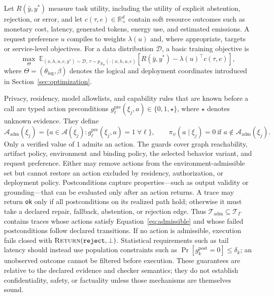 Let $R(\bar y,y^*)$ measure task utility, including the utility of explicit
abstention, rejection, or error, and let
$c(\tau,e)\in\mathbb{R}_{+}^{d}$ contain soft resource outcomes such as monetary
cost, latency, generated tokens, energy use, and estimated emissions. A
request preference $u$ compiles to weights $\lambda(u)$ and, where appropriate,
targets or service-level objectives.  For a data distribution $\mathcal{D}$, a
basic training objective is
\begin{equation}
 \max_{\Theta}
 \;\mathbb{E}_{(x,h,u,e,y^*)\sim\mathcal{D},\,
 \tau\sim p_{\mathcal{R}_{\Theta}}(\cdot\mid x,h,u,e)}
 \left[R(\bar y,y^*)-\lambda(u)^{\top}c(\tau,e)\right],
 \label{eq:soft-objective}
\end{equation}
where $\Theta=(\theta_{\mathrm{log}},\beta)$ denotes the logical and deployment
coordinates introduced in Section~\ref{sec:optimization}.

Privacy, residency, model allowlists, and capability rules that are known
before a call are typed action preconditions
$g_\ell^{\mathrm{pre}}(\xi_j,a)\in\{0,1,\star\}$, where $\star$ denotes
unknown evidence. They define
\begin{equation}
 \mathcal{A}_{\mathrm{adm}}(\xi_j)
 =\{a\in\mathcal{A}(\xi_j):
 g_\ell^{\mathrm{pre}}(\xi_j,a)=1\;\forall \ell\},
 \qquad
 \pi_\psi(a\mid\xi_j)=0\ \text{if }a\notin\mathcal{A}_{\mathrm{adm}}(\xi_j).
 \label{eq:admissible}
\end{equation}
Only a verified value of $1$ admits an action. The guards cover graph
reachability, artifact policy, environment and binding policy, the selected
behavior variant, and request preference. Either may remove actions from the
environment-admissible set but cannot restore an action excluded by residency,
authorization, or deployment policy.
Postconditions capture properties---such as output validity or grounding---that
can be evaluated only after an action returns. A trace may return \texttt{ok}
only if all postconditions on its realized path hold; otherwise it must take a
declared repair, fallback, abstention, or rejection edge. Thus
$\mathcal{T}_{\mathrm{adm}}\subseteq\mathcal{T}_{\Gamma}$ contains traces whose
actions satisfy Equation~\ref{eq:admissible} and whose failed postconditions
follow declared transitions. If no action is admissible, execution fails closed
with $\textsc{Return}(\texttt{reject},\bot)$. Statistical requirements such as
tail latency should instead use population constraints such as
$\Pr[g_k^{\mathrm{post}}=0]\leq\delta_k$; an unobserved outcome cannot be
filtered before execution.
These guarantees are relative to the declared evidence and checker semantics;
they do not establish confidentiality, safety, or factuality unless those
mechanisms are themselves sound.


